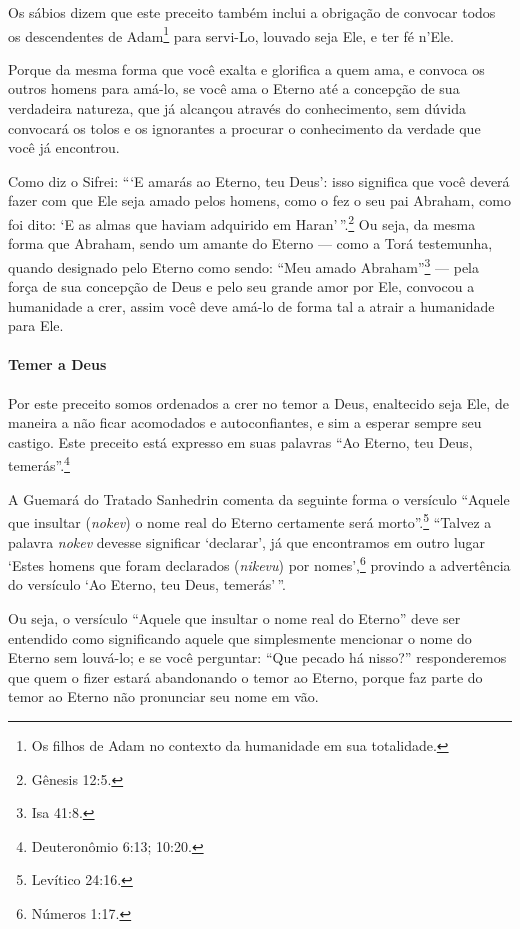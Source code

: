 Os sábios dizem que este preceito também inclui a obrigação de convocar todos os descendentes de Adam\footnote{Os filhos de Adam no contexto da humanidade em sua totalidade.} para servi-Lo, louvado seja Ele, e ter fé n'Ele. 

Porque da mesma forma que você exalta e glorifica a
quem ama, e convoca os outros homens para amá-lo, se você ama o Eterno
até a concepção de sua verdadeira natureza, que já alcançou através do
conhecimento, sem dúvida convocará os tolos e os ignorantes a procurar
o conhecimento da verdade que você já encontrou.

Como diz o Sifrei: ```E amarás ao Eterno, teu Deus': isso significa que
você deverá fazer com que Ele seja amado pelos homens, como o fez o seu
pai Abraham, como foi dito: `E as almas que haviam adquirido em Haran'\,''.\footnote{Gênesis 12:5.} Ou seja, da mesma forma que Abraham, sendo um amante do Eterno --- como a Torá testemunha, quando designado pelo Eterno como
sendo: ``Meu amado Abraham''\footnote{Isa 41:8.} --- pela força de sua
concepção de Deus e pelo seu grande amor por Ele, convocou a humanidade a crer, assim você deve amá-lo de forma tal a atrair a humanidade para Ele.

\paragraph{Temer a Deus}

Por este preceito somos ordenados a crer no temor a Deus, enaltecido
seja Ele, de maneira a não ficar acomodados e autoconfiantes, e sim a
esperar sempre seu castigo. Este preceito está expresso em suas
palavras ``Ao Eterno, teu Deus, temerás''.\footnote{Deuteronômio 6:13; 10:20.}

A Guemará do Tratado Sanhedrin\starr{} comenta da seguinte forma o versículo
``Aquele que insultar (\emph{nokev}) o nome real do Eterno certamente
será morto''.\footnote{Levítico 24:16.} ``Talvez a palavra \emph{nokev} devesse
significar `declarar', já que encontramos em outro lugar `Estes homens
que foram declarados (\emph{nikevu}) por nomes',\footnote{Números 1:17.} provindo a advertência do versículo `Ao Eterno, teu Deus, temerás'\,''. 

Ou seja, o versículo ``Aquele que insultar o nome real do Eterno'' deve ser
entendido como significando aquele que simplesmente mencionar o nome do
Eterno sem louvá-lo; e se você perguntar: ``Que pecado há nisso?'' responderemos que quem o fizer estará abandonando o temor
ao Eterno, porque faz parte do temor ao Eterno não pronunciar seu nome
em vão.

